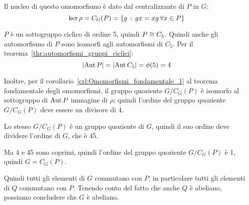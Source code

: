 \begin{soluzione}
    Il nucleo di questo omomorfismo è dato dal centralizzante di $P$ in $G$:
    \begin{equation*}
        \ker \rho = C_G(P) = \{g \,:\, gx = xg \,\forall x \in P\}
    \end{equation*}

    $P$ è un sottogruppo ciclico di ordine 5, quindi $P \cong C_5$.
    Quindi anche gli automorfismo di $P$ sono isomorfi agli automorfismi di $C_5$.
    Per il teorema~\ref{thr:automorfismi_gruppi_ciclici}:
    \begin{equation*}
        \lvert \operatorname{Aut} P \rvert = \lvert \operatorname{Aut} C_5 \rvert = \phi(5) = 4
    \end{equation*}

    Inoltre, per il corollario~\ref{crl:Omomorfismi_fondamentale_1} al teorema fondamentale degli omomorfismi,
    il gruppo quoziente $G/C_G(P)$ è isomorfo al sottogruppo di $\operatorname{Aut} P$ immagine di $\rho$;
    quindi l'ordine del gruppo quoziente $G/C_G(P)$ deve essere un divisore di 4.

    Lo stesso $G/C_G(P)$ è un gruppo quoziente di $G$, quindi il suo ordine deve dividere l'ordine di $G$, che è 45.

    Ma 4 e 45 sono coprimi, quindi l'ordine del gruppo quoziente $G/C_G(P)$ è 1, quindi $G = C_G(P)$.

    Quindi tutti gli elementi di $G$ commutano con $P$, in particolare tutti gli elementi di $Q$ commutano con $P$.
    Tenendo conto del fatto che anche $Q$ è abeliano, possiamo concludere che $G$ è abeliano.
\end{soluzione}

